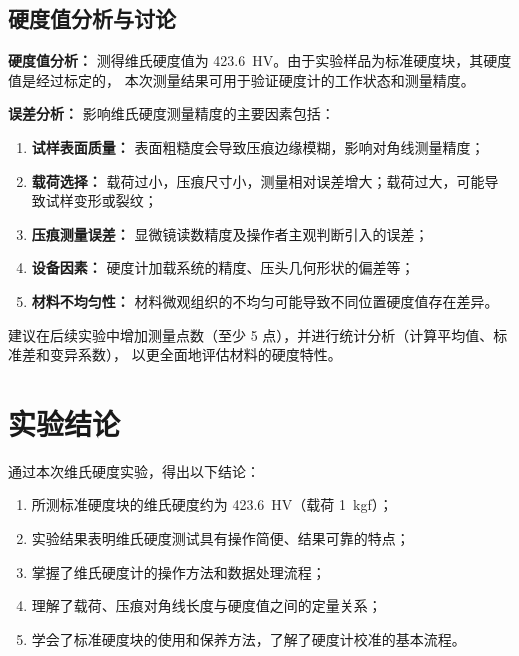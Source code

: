 \subsection{硬度值分析与讨论}

\textbf{硬度值分析：} 测得维氏硬度值为 423.6~HV。由于实验样品为标准硬度块，其硬度值是经过标定的，
本次测量结果可用于验证硬度计的工作状态和测量精度。

\textbf{误差分析：} 影响维氏硬度测量精度的主要因素包括：
\begin{enumerate}[label=(\arabic*)]
    \item \textbf{试样表面质量：} 表面粗糙度会导致压痕边缘模糊，影响对角线测量精度；
    \item \textbf{载荷选择：} 载荷过小，压痕尺寸小，测量相对误差增大；载荷过大，可能导致试样变形或裂纹；
    \item \textbf{压痕测量误差：} 显微镜读数精度及操作者主观判断引入的误差；
    \item \textbf{设备因素：} 硬度计加载系统的精度、压头几何形状的偏差等；
    \item \textbf{材料不均匀性：} 材料微观组织的不均匀可能导致不同位置硬度值存在差异。
\end{enumerate}

建议在后续实验中增加测量点数（至少 5 点），并进行统计分析（计算平均值、标准差和变异系数），
以更全面地评估材料的硬度特性。


\section{实验结论}

通过本次维氏硬度实验，得出以下结论：

\begin{enumerate}[label=(\arabic*)]
    \item 所测标准硬度块的维氏硬度约为 423.6~HV（载荷 1~kgf）；
    \item 实验结果表明维氏硬度测试具有操作简便、结果可靠的特点；
    \item 掌握了维氏硬度计的操作方法和数据处理流程；
    \item 理解了载荷、压痕对角线长度与硬度值之间的定量关系；
    \item 学会了标准硬度块的使用和保养方法，了解了硬度计校准的基本流程。
\end{enumerate}


